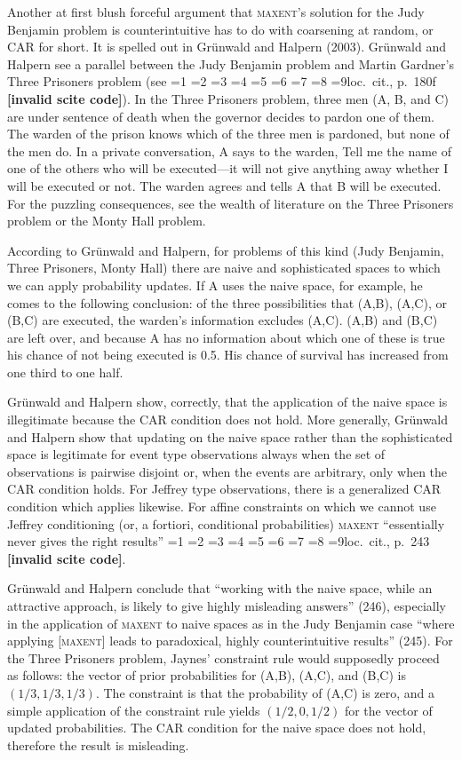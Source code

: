 \documentclass[12pt]{article}
\newcommand{\nonsc}[1]{}
\newcommand{\qeins}[1]{``#1''}
\newif\ifNumericalOrYear
\newcommand{\PageP}{p.~}
\newcommand{\PageP}{}
\newcommand{\nias}{\noindent} %
\newcommand{\scite}[3]{\ifnum#1=1\ifNumericalOrYear\citep{#2}\else\citeyearpar{#2}\fi\else
\ifnum#1=2\ifNumericalOrYear\citep[#3]{#2}\else\citep[{\PageP}#3]{#2}\fi\else
\ifnum#1=3\ifNumericalOrYear(\citet[#3]{#2})\else\citep[{\PageP}#3]{#2}\fi\else
\ifnum#1=4\ifNumericalOrYear\citet{#2}\else\citet{#2}\fi\else
\ifnum#1=5\ifNumericalOrYear(\citet{#2})\else\citep{#2}\fi\else
\ifnum#1=6\ifNumericalOrYear(\citet[#3]{#2})\else\citep[{\PageP}#3]{#2}\fi\else
\ifnum#1=7\ifNumericalOrYear\citep{#2}\else\citealp{#2}\fi\else
\ifnum#1=8\ifNumericalOrYear\citep[#3]{#2}\else\citealp[{\PageP}#3]{#2}\fi\else
\ifnum#1=9\ifNumericalOrYear\citep[#3]{#2}\else{}loc.\ cit., {\PageP}#3\fi\else
\textbf{[invalid scite code]}\fi\fi\fi\fi\fi\fi\fi\fi\fi}
\begin{document}
\bigskip

\nias Another at first blush forceful argument that \textsc{maxent}'s
solution for the Judy Benjamin problem is counterintuitive has to do
with coarsening at random, or CAR for short. It is spelled out in
Gr{\"u}nwald and Halpern (2003)\nonsc{}. Gr{\"u}nwald and Halpern see
a parallel between the Judy Benjamin problem and Martin Gardner's
Three Prisoners problem (see \scite{8}{gardner59}{180f}). In the Three
Prisoners problem, three men (A, B, and C) are under sentence of death
when the governor decides to pardon one of them. The warden of the
prison knows which of the three men is pardoned, but none of the men
do. In a private conversation, A says to the warden, Tell me the name
of one of the others who will be executed---it will not give anything
away whether I will be executed or not. The warden agrees and tells A
that B will be executed. For the puzzling consequences, see the wealth
of literature on the Three Prisoners problem or the Monty Hall
problem.

According to Gr{\"u}nwald and Halpern, for problems of this kind (Judy
Benjamin, Three Prisoners, Monty Hall) there are naive and
sophisticated spaces to which we can apply probability updates. If A
uses the naive space, for example, he comes to the following
conclusion: of the three possibilities that (A,B), (A,C), or (B,C) are
executed, the warden's information excludes (A,C). (A,B) and (B,C) are
left over, and because A has no information about which one of these
is true his chance of not being executed is 0.5. His chance of
survival has increased from one third to one half. 

Gr{\"u}nwald and Halpern show, correctly, that the application of the
naive space is illegitimate because the CAR condition does not hold.
More generally, Gr{\"u}nwald and Halpern show that updating on the
naive space rather than the sophisticated space is legitimate for
event type observations always when the set of observations is
pairwise disjoint or, when the events are arbitrary, only when the CAR
condition holds. For Jeffrey type observations, there is a generalized
CAR condition which applies likewise. For affine constraints on which
we cannot use Jeffrey conditioning (or, a fortiori, conditional
probabilities) \textsc{maxent }\qeins{essentially never gives the
  right results} \scite{2}{gruenwaldhalpern03}{243}.

Gr{\"u}nwald and Halpern conclude that \qeins{working with the naive
  space, while an attractive approach, is likely to give highly
  misleading answers} (246), especially in the application of
\textsc{maxent} to naive spaces as in the Judy Benjamin case
\qeins{where applying [\textsc{maxent}] leads to paradoxical, highly
  counterintuitive results} (245). For the Three Prisoners problem,
Jaynes' constraint rule would supposedly proceed as follows: the
vector of prior probabilities for (A,B), (A,C), and (B,C) is
$(1/3,1/3,1/3)$. The constraint is that the probability of (A,C) is
zero, and a simple application of the constraint rule yields
$(1/2,0,1/2)$ for the vector of updated probabilities. The CAR
condition for the naive space does not hold, therefore the result is
misleading.
\end{document}
